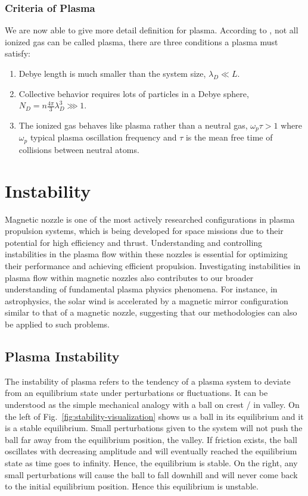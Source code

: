 \subsubsection*{Criteria of Plasma}
We are now able to give more detail definition for plasma. According to \cite{chen_introduction_2016}, not all ionized gas can be called plasma, there are three conditions a plasma must satisfy:
\begin{enumerate}
	\item Debye length is much smaller than the system size, $\lambda_D \ll L$.
	\item Collective behavior requires lots of particles in a Debye sphere, $N_D = n\frac{4\pi}{3}\lambda_D^3 \ggg 1$.
	\item The ionized gas behaves like plasma rather than a neutral gas, $\omega_p\tau > 1$ where $\omega_p$ typical plasma oscillation frequency and $\tau$ is the mean free time of collisions between neutral atoms.
\end{enumerate}


\section{Instability} \label{sec:instability-of-plasma-flow}
Magnetic nozzle is one of the most actively researched configurations in plasma propulsion systems, which is being developed for space missions due to their potential for high efficiency and thrust. Understanding and controlling instabilities in the plasma flow within these nozzles is essential for optimizing their performance and achieving efficient propulsion. Investigating instabilities in plasma flow within magnetic nozzles also contributes to our broader understanding of fundamental plasma physics phenomena. For instance, in astrophysics, the solar wind is accelerated by a magnetic mirror configuration similar to that of a magnetic nozzle, suggesting that our methodologies can also be applied to such problems.

\subsection{Plasma Instability}
The instability of plasma refers to the tendency of a plasma system to deviate from an equilibrium state under perturbations or fluctuations. It can be understood as the simple mechanical analogy with a ball on crest / in valley. On the left of Fig.~\ref{fig:stability-visualization} shows us a ball in its equilibrium and it is a stable equilibrium. Small perturbations given to the system will not push the ball far away from the equilibrium position, the valley. If friction exists, the ball oscillates with decreasing amplitude and will eventually reached the equilibrium state as time goes to infinity. Hence, the equilibrium is stable. On the right, any small perturbations will cause the ball to fall downhill and will never come back to the initial equilibrium position. Hence this equilibrium is unstable.

